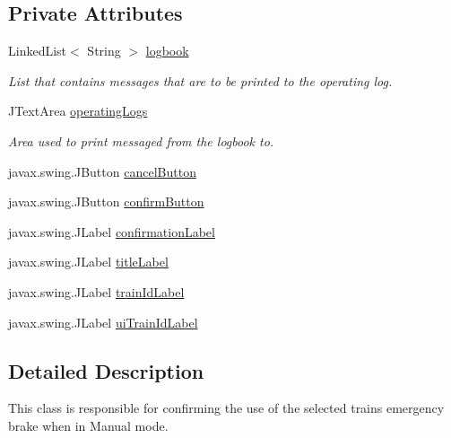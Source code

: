 \subsection*{Private Attributes}
\begin{DoxyCompactItemize}
\item 
Linked\+List$<$ String $>$ \hyperlink{classTrainControllerComps_1_1TCEmergencyFrame_a862e94d85954c294ac65c7ad438e81a1}{logbook}
\begin{DoxyCompactList}\small\item\em List that contains messages that are to be printed to the operating log. \end{DoxyCompactList}\item 
J\+Text\+Area \hyperlink{classTrainControllerComps_1_1TCEmergencyFrame_acc095e29e87ce6e8cb31fbc942303d78}{operating\+Logs}
\begin{DoxyCompactList}\small\item\em Area used to print messaged from the logbook to. \end{DoxyCompactList}\item 
javax.\+swing.\+J\+Button \hyperlink{classTrainControllerComps_1_1TCEmergencyFrame_a26994214c39f2a3b8f0dba373cfb0b5e}{cancel\+Button}
\item 
javax.\+swing.\+J\+Button \hyperlink{classTrainControllerComps_1_1TCEmergencyFrame_a09a53fb532f9214e271fc811c729a274}{confirm\+Button}
\item 
javax.\+swing.\+J\+Label \hyperlink{classTrainControllerComps_1_1TCEmergencyFrame_ab69b8c59e98e915d38dd2eff13711fea}{confirmation\+Label}
\item 
javax.\+swing.\+J\+Label \hyperlink{classTrainControllerComps_1_1TCEmergencyFrame_a611138a25d7b488a12107dc7e3b9efaa}{title\+Label}
\item 
javax.\+swing.\+J\+Label \hyperlink{classTrainControllerComps_1_1TCEmergencyFrame_abcbe7bf869507518346fef39f3701ec7}{train\+Id\+Label}
\item 
javax.\+swing.\+J\+Label \hyperlink{classTrainControllerComps_1_1TCEmergencyFrame_aed0a549c9bb0b9a7adf7b4d81fd21904}{ui\+Train\+Id\+Label}
\end{DoxyCompactItemize}


\subsection{Detailed Description}
This class is responsible for confirming the use of the selected trains emergency brake when in Manual mode. 

